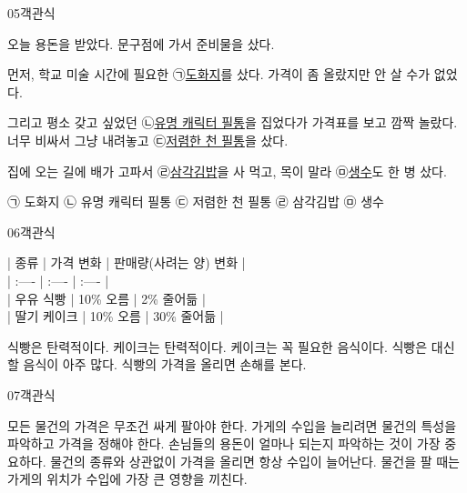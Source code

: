\documentclass[fs9,seriesFre]{korfarm-base}
\begin{document}
\begin{kfQBlock}{05}{객관식}
\begin{kfEvidence}오늘 용돈을 받았다. 문구점에 가서 준비물을 샀다.

먼저, 학교 미술 시간에 필요한 ㉠\uline{도화지}를 샀다. 가격이 좀 올랐지만 안 살 수가 없었다.

그리고 평소 갖고 싶었던 ㉡\uline{유명 캐릭터 필통}을 집었다가 가격표를 보고 깜짝 놀랐다. 너무 비싸서 그냥 내려놓고 ㉢\uline{저렴한 천 필통}을 샀다.

집에 오는 길에 배가 고파서 ㉣\uline{삼각김밥}을 사 먹고, 목이 말라 ㉤\uline{생수}도 한 병 샀다.\end{kfEvidence}
\begin{kfChoices}
\kfChoice ㉠ 도화지
\kfChoice ㉡ 유명 캐릭터 필통
\kfChoice ㉢ 저렴한 천 필통
\kfChoice ㉣ 삼각김밥
\kfChoice ㉤ 생수
\end{kfChoices}
\end{kfQBlock}
\begin{kfQBlock}{06}{객관식}
\begin{kfEvidence}| 종류 | 가격 변화 | 판매량(사려는 양) 변화 | \\\relax
| :---- | :---- | :---- | \\\relax
| 우유 식빵 | 10\% 오름 | 2\% 줄어듦 | \\\relax
| 딸기 케이크 | 10\% 오름 | 30\% 줄어듦 |\end{kfEvidence}
\begin{kfChoices}
\kfChoice 식빵은 탄력적이다.
\kfChoice 케이크는 탄력적이다.
\kfChoice 케이크는 꼭 필요한 음식이다.
\kfChoice 식빵은 대신할 음식이 아주 많다.
\kfChoice 식빵의 가격을 올리면 손해를 본다.
\end{kfChoices}
\end{kfQBlock}
\begin{kfQBlock}{07}{객관식}
\begin{kfChoices}
\kfChoice 모든 물건의 가격은 무조건 싸게 팔아야 한다.
\kfChoice 가게의 수입을 늘리려면 물건의 특성을 파악하고 가격을 정해야 한다.
\kfChoice 손님들의 용돈이 얼마나 되는지 파악하는 것이 가장 중요하다.
\kfChoice 물건의 종류와 상관없이 가격을 올리면 항상 수입이 늘어난다.
\kfChoice 물건을 팔 때는 가게의 위치가 수입에 가장 큰 영향을 끼친다.
\end{kfChoices}
\end{kfQBlock}
\end{document}
